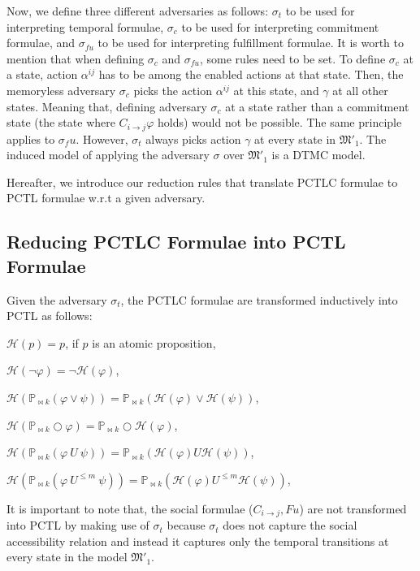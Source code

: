 Now, we define three different adversaries as follows: $\sigma_t$ to
be used for interpreting temporal formulae, $\sigma_c$ to be used
for interpreting commitment formulae, and $\sigma_{fu}$ to be used for
interpreting fulfillment formulae. It is worth to mention that
when defining $\sigma_c$ and $\sigma_{fu}$, some rules need to be
set. To define $\sigma_c$ at a state, action $\alpha^{ij}$ has to
be among the enabled actions at that state. Then, the memoryless
adversary $\sigma_c$ picks the action $\alpha^{ij}$ at this state,
and $\gamma$ at all other states. Meaning that, defining adversary
$\sigma_c$ at a state rather than a commitment state (the state
where $C_{i\rightarrow j}\varphi$ holds) would not be possible.
The same principle applies to $\sigma_fu$. However, $\sigma_t$
always picks action $\gamma$ at every state in
$\mathfrak{M'_1}$. The induced model of applying the adversary $\sigma$ over $\mathfrak{M'_1}$ is a DTMC model.



Hereafter, we introduce our reduction rules that translate PCTLC
formulae to PCTL formulae w.r.t a given adversary.


\subsection{Reducing PCTLC Formulae into PCTL Formulae} \label{sec:reducing-pctlc-to-pctl}


Given the adversary $\sigma_t$, the PCTLC formulae are transformed
inductively into PCTL as follows:

$\mathscr{H}(p)=p$, if $p$ is an atomic proposition,

$\mathscr{H}(\neg \varphi)= \neg \mathscr{H} (\varphi)$,

$\mathscr{H}(\mathbb{P}_{\bowtie k}(\varphi \vee \psi))=\mathbb{P}_{\bowtie k}(\mathscr{H}(\varphi) \vee \mathscr{H}(\psi))$,

$\mathscr{H}(\mathbb{P}_{\bowtie k}\bigcirc \varphi)=\mathbb{P}_{\bowtie k} \bigcirc \mathscr{H}(\varphi)$,

$\mathscr{H}(\mathbb{P}_{\bowtie k}(\varphi~ U ~ \psi))=\mathbb{P}_{\bowtie k} (\mathscr{H}(\varphi) U \mathscr{H}(\psi))$,

$\mathscr{H}(\mathbb{P}_{\bowtie k}(\varphi~ U^{\leq m} ~ \psi))=\mathbb{P}_{\bowtie k} (\mathscr{H}(\varphi) U^{\leq m} \mathscr{H}(\psi))$,

It is important to note that, the social formulae
($C_{i\rightarrow j}, Fu$) are not transformed into PCTL by making
use of $\sigma_t$ because $\sigma_t$ does not capture the social
accessibility relation and instead it captures only the temporal
transitions at every state in the model $\mathfrak{M'_1}$.

